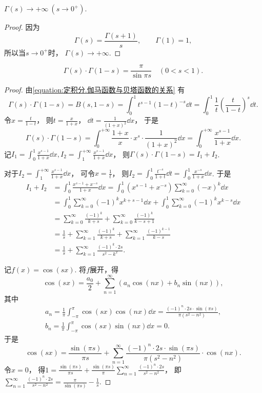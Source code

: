 \begin{property}
\(\Gamma(s)\to+\infty\ (s\to0^+)\).
\begin{proof}
因为\[
	\Gamma(s) = \frac{\Gamma(s+1)}{s},
	\qquad
	\Gamma(1) = 1,
\]
所以当\(s\to0^+\)时，
\(\Gamma(s)\to+\infty\).
\end{proof}
\end{property}

\begin{property}[余元公式]
\begin{equation}\label{equation:定积分.余元公式}
	\Gamma(s) \cdot \Gamma(1-s)
	= \frac{\pi}{\sin{\pi s}} \quad (0 < s < 1).
\end{equation}
\begin{proof}
由\cref{equation:定积分.伽马函数与贝塔函数的关系} 有\[
	\Gamma(s) \cdot \Gamma(1-s)
	= B(s,1-s)
	= \int_0^1 t^{s-1} (1-t)^{-s} \dd{t}
	= \int_0^1 \frac1t \left(\frac{t}{1-t}\right)^s \dd{t}.
\]
令\(x=\frac{t}{1-t}\)，
则\(t=\frac{x}{1+x}\)，
\(\dd{t}=\frac1{(1+x)^2} \dd{x}\)，
于是\[
	\Gamma(s) \cdot \Gamma(1-s)
	= \int_0^{+\infty} \frac{1+x}{x} \cdot x^s \cdot \frac1{(1+x)^2} \dd{x}
	= \int_0^{+\infty} \frac{x^{s-1}}{1+x} \dd{x}.
\]
记\(I_1 = \int_0^1 \frac{x^{s-1}}{1+x} \dd{x},
I_2 = \int_1^{+\infty} \frac{x^{s-1}}{1+x} \dd{x}\)，
则\(\Gamma(s) \cdot \Gamma(1-s) = I_1 + I_2\).

对于\(I_2 = \int_1^{+\infty} \frac{x^{s-1}}{1+x} \dd{x}\)，
可令\(x = \frac1t\)，
则\(I_2
= \int_0^1 \frac{t^{-s}}{1+t} \dd{t}
= \int_0^1 \frac{x^{-s}}{1+x} \dd{x}\).
于是\begin{align*}
	I_1 + I_2
	&= \int_0^1 \frac{x^{s-1} + x^{-s}}{1+x} \dd{x}
	= \int_0^1 (x^{s-1} + x^{-s}) \sum_{k=0}^\infty (-x)^k \dd{x} \\%
	&= \int_0^1 \sum_{k=0}^\infty (-1)^k x^{k+s-1} \dd{x}
	+ \int_0^1 \sum_{k=0}^\infty (-1)^k x^{k-s} \dd{x} \\
	&= \sum_{k=0}^\infty \frac{(-1)^k}{k+s}
	+ \sum_{k=0}^\infty \frac{(-1)^k}{k-s+1} \\
	&= \frac1s
	+ \sum_{k=1}^\infty \frac{(-1)^k}{k+s}
	+ \sum_{k=1}^\infty \frac{(-1)^{k-1}}{k-s} \\
	&= \frac1s + \sum_{k=1}^\infty \frac{(-1)^k \cdot 2s}{s^2-k^2}.
\end{align*}

记\(f(x)=\cos(sx)\).
将\(f\)展开，得\[
	\cos(sx) = \frac{a_0}2 + \sum_{n=1}^\infty (a_n \cos(nx) + b_n \sin(nx)),
\]
其中\begin{gather*}
	a_n = \frac1\pi \int_{-\pi}^\pi \cos(sx) \cos(nx) \dd{x}
	= \frac{(-1)^n \cdot 2s \cdot \sin(\pi s)}{\pi(s^2-n^2)}, \\
	b_n = \frac1\pi \int_{-\pi}^\pi \cos(sx) \sin(nx) \dd{x} = 0.
\end{gather*}
于是\[
	\cos(sx) = \frac{\sin(\pi s)}{\pi s}
	+ \sum_{n=1}^\infty \frac{(-1)^n \cdot 2s \cdot \sin(\pi s)}{\pi(s^2-n^2)} \cdot \cos(nx).
\]
令\(x=0\)，
得\(1 = \frac{\sin(\pi s)}{\pi s}
+ \frac{\sin(\pi s)}{\pi} \sum_{n=1}^\infty \frac{(-1)^n \cdot 2s}{s^2-n^2}\)，
即\(\sum_{n=1}^\infty \frac{(-1)^n \cdot 2s}{s^2-n^2} = \frac{\pi}{\sin(\pi s)} - \frac1s\).


\end{proof}
\end{property}
